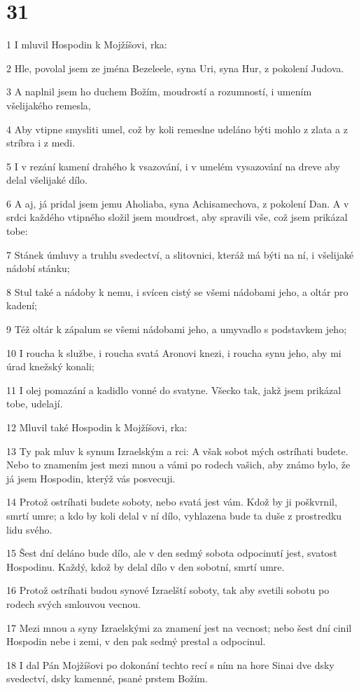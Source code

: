 \chapter{31}

\par 1 I mluvil Hospodin k Mojžíšovi, rka:
\par 2 Hle, povolal jsem ze jména Bezeleele, syna Uri, syna Hur, z pokolení Judova.
\par 3 A naplnil jsem ho duchem Božím, moudrostí a rozumností, i umením všelijakého remesla,
\par 4 Aby vtipne smysliti umel, což by koli remeslne udeláno býti mohlo z zlata a z stríbra i z medi.
\par 5 I v rezání kamení drahého k vsazování, i v umelém vysazování na dreve aby delal všelijaké dílo.
\par 6 A aj, já pridal jsem jemu Aholiaba, syna Achisamechova, z pokolení Dan. A v srdci každého vtipného složil jsem moudrost, aby spravili vše, což jsem prikázal tobe:
\par 7 Stánek úmluvy a truhlu svedectví, a slitovnici, kteráž má býti na ní, i všelijaké nádobí stánku;
\par 8 Stul také a nádoby k nemu, i svícen cistý se všemi nádobami jeho, a oltár pro kadení;
\par 9 Též oltár k zápalum se všemi nádobami jeho, a umyvadlo s podstavkem jeho;
\par 10 I roucha k službe, i roucha svatá Aronovi knezi, i roucha synu jeho, aby mi úrad knežský konali;
\par 11 I olej pomazání a kadidlo vonné do svatyne. Všecko tak, jakž jsem prikázal tobe, udelají.
\par 12 Mluvil také Hospodin k Mojžíšovi, rka:
\par 13 Ty pak mluv k synum Izraelským a rci: A však sobot mých ostríhati budete. Nebo to znamením jest mezi mnou a vámi po rodech vašich, aby známo bylo, že já jsem Hospodin, kterýž vás posvecuji.
\par 14 Protož ostríhati budete soboty, nebo svatá jest vám. Kdož by ji poškvrnil, smrtí umre; a kdo by koli delal v ní dílo, vyhlazena bude ta duše z prostredku lidu svého.
\par 15 Šest dní deláno bude dílo, ale v den sedmý sobota odpocinutí jest, svatost Hospodinu. Každý, kdož by delal dílo v den sobotní, smrtí umre.
\par 16 Protož ostríhati budou synové Izraelští soboty, tak aby svetili sobotu po rodech svých smlouvou vecnou.
\par 17 Mezi mnou a syny Izraelskými za znamení jest na vecnost; nebo šest dní cinil Hospodin nebe i zemi, v den pak sedmý prestal a odpocinul.
\par 18 I dal Pán Mojžíšovi po dokonání techto recí s ním na hore Sinai dve dsky svedectví, dsky kamenné, psané prstem Božím.

